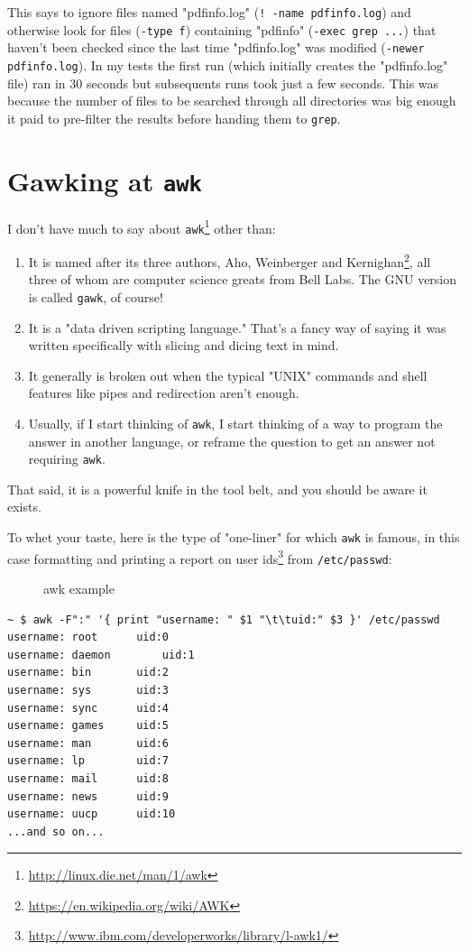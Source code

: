 \documentclass[10pt,]{book}
\renewcommand{\href}[2]{#2\footnote{\url{#1}}}
\numberwithin{figure}{chapter}
\DeclareRobustCommand{\drcap}[1]{\begin{figure}[H]\caption{#1}\end{figure}}
\DeclareRobustCommand{\drcmd}[1]{\index{Commands!#1}}
\begin{document}
This says to ignore files named "pdfinfo.log"
(\texttt{! -name pdfinfo.log}) and otherwise look for files
(\texttt{-type f}) containing "pdfinfo" (\texttt{-exec grep ...}) that
haven't been checked since the last time "pdfinfo.log" was modified
(\texttt{-newer pdfinfo.log}). In my tests the first run (which
initially creates the "pdfinfo.log" file) ran in 30 seconds but
subsequents runs took just a few seconds. This was because the number of
files to be searched through all directories was big enough it paid to
pre-filter the results before handing them to \texttt{grep}.

\section{Gawking at \texttt{awk}}\label{gawking-at-awk}

I don't have much to say about
\href{http://linux.die.net/man/1/awk}{\texttt{awk}}\drcmd{awk} other
than:

\begin{enumerate}
\def\labelenumi{\arabic{enumi}.}
\item
  It is named after its three authors,
  \href{https://en.wikipedia.org/wiki/AWK}{Aho, Weinberger and
  Kernighan}, all three of whom are computer science greats from Bell
  Labs. The GNU version is called \texttt{gawk}, of course!
\item
  It is a "data driven scripting language." That's a fancy way of saying
  it was written specifically with slicing and dicing text in mind.
\item
  It generally is broken out when the typical "UNIX" commands and shell
  features like pipes and redirection aren't enough.
\item
  Usually, if I start thinking of \texttt{awk}, I start thinking of a
  way to program the answer in another language, or reframe the question
  to get an answer not requiring \texttt{awk}.
\end{enumerate}

That said, it is a powerful knife in the tool belt, and you should be
aware it exists.

To whet your taste, here is the type of "one-liner" for which
\texttt{awk} is famous, in this case
\href{http://www.ibm.com/developerworks/library/l-awk1/}{formatting and
printing a report on user ids} from \texttt{/etc/passwd}:

\drcap{awk example}

\begin{verbatim}
~ $ awk -F":" '{ print "username: " $1 "\t\tuid:" $3 }' /etc/passwd
username: root      uid:0
username: daemon        uid:1
username: bin       uid:2
username: sys       uid:3
username: sync      uid:4
username: games     uid:5
username: man       uid:6
username: lp        uid:7
username: mail      uid:8
username: news      uid:9
username: uucp      uid:10
...and so on...
\end{verbatim}
\end{document}
